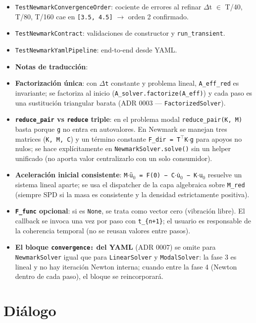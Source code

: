 \documentclass[11pt,letterpaper,oneside]{report}
\begin{document}
\begin{itemize}
  \item \texttt{TestNewmarkConvergenceOrder}: cociente de errores al refinar \ensuremath{\Delta}t \ensuremath{\in} {T/40, T/80, T/160} cae en \texttt{[3.5, 4.5]} \ensuremath{\to} orden 2 confirmado.
  \item \texttt{TestNewmarkContract}: validaciones de constructor y \texttt{run\_transient}.
  \item \texttt{TestNewmarkYamlPipeline}: end-to-end desde YAML.
  \item \textbf{Notas de traducción}:
  \item \textbf{Factorización única}: con \texttt{\ensuremath{\Delta}t} constante y problema lineal, \texttt{A\_eff\_red} es invariante; se factoriza al inicio (\texttt{A\_solver.factorize(A\_eff)}) y cada paso es una sustitución triangular barata (ADR 0003 --- \texttt{FactorizedSolver}).
  \item \textbf{\texttt{reduce\_pair} vs \texttt{reduce} triple}: en el problema modal \texttt{reduce\_pair(K, M)} basta porque \texttt{g} no entra en autovalores. En Newmark se manejan tres matrices (\texttt{K, M, C}) y un término constante \texttt{F\_dir = T\ensuremath{^{\top}}K\ensuremath{\cdot}g} para apoyos no nulos; se hace explícitamente en \texttt{NewmarkSolver.solve()} sin un helper unificado (no aporta valor centralizarlo con un solo consumidor).
  \item \textbf{Aceleración inicial consistente}: \texttt{M\ensuremath{\cdot}ü\ensuremath{_{0}} = F(0) − C\ensuremath{\cdot}u̇\ensuremath{_{0}} − K\ensuremath{\cdot}u\ensuremath{_{0}}} resuelve un sistema lineal aparte; se usa el dispatcher de la capa algebraica sobre \texttt{M\_red} (siempre SPD si la masa es consistente y la densidad estrictamente positiva).
  \item \textbf{\texttt{F\_func} opcional}: si es \texttt{None}, se trata como vector cero (vibración libre). El callback se invoca una vez por paso con \texttt{t\_\{n+1\}}; el usuario es responsable de la coherencia temporal (no se reusan valores entre pasos).
  \item \textbf{El bloque \texttt{convergence:} del YAML} (ADR 0007) se omite para \texttt{NewmarkSolver} igual que para \texttt{LinearSolver} y \texttt{ModalSolver}: la fase 3 es lineal y no hay iteración Newton interna; cuando entre la fase 4 (Newton dentro de cada paso), el bloque se reincorporará.
\end{itemize}


\section{Diálogo}
\end{document}
